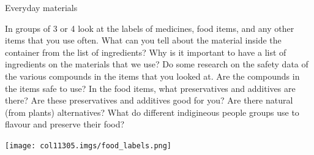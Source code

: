     \label{m38708*eip-344}\begin{activity}{Everyday materials}
{
\begin{minipage}{.5\textwidth}
In groups of 3 or 4 look at the labels of medicines, food items, and any other items that you use often. What can you tell about the material inside the container from the list of ingredients? Why is it important to have a list of ingredients on the materials that we use? Do some research on the safety data of the various compounds in the items that you looked at. Are the compounds in the items safe to use? In the food items, what preservatives and additives are there? Are these preservatives and additives good for you? Are there natural (from plants) alternatives? What do different indigineous people groups use to flavour and preserve their food?
\end{minipage}
\begin{minipage}{.5\textwidth}
 \begin{center}
 \texttt{[image: col11305.imgs/food\_labels.png]}\par
\end{center}
\end{minipage}

 }  \end{activity}\par \label{m38708*cid2}
